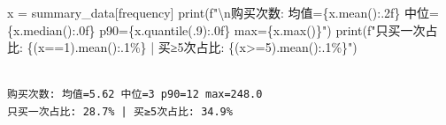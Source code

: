 \documentclass[
]{ctexart}
\newenvironment{Shaded}{\begin{snugshade}}{\end{snugshade}}
\newcommand{\BuiltInTok}[1]{\textcolor[rgb]{0.00,0.23,0.31}{#1}}
\newcommand{\CharTok}[1]{\textcolor[rgb]{0.13,0.47,0.30}{#1}}
\newcommand{\DecValTok}[1]{\textcolor[rgb]{0.68,0.00,0.00}{#1}}
\newcommand{\FloatTok}[1]{\textcolor[rgb]{0.68,0.00,0.00}{#1}}
\newcommand{\NormalTok}[1]{\textcolor[rgb]{0.00,0.23,0.31}{#1}}
\newcommand{\OperatorTok}[1]{\textcolor[rgb]{0.37,0.37,0.37}{#1}}
\newcommand{\SpecialCharTok}[1]{\textcolor[rgb]{0.37,0.37,0.37}{#1}}
\newcommand{\SpecialStringTok}[1]{\textcolor[rgb]{0.13,0.47,0.30}{#1}}
\newcommand{\StringTok}[1]{\textcolor[rgb]{0.13,0.47,0.30}{#1}}
\begin{document}
\begin{Shaded}
\begin{Highlighting}[]
\NormalTok{x }\OperatorTok{=}\NormalTok{ summary\_data[}\StringTok{\textquotesingle{}frequency\textquotesingle{}}\NormalTok{]}
\BuiltInTok{print}\NormalTok{(}\SpecialStringTok{f"}\CharTok{\textbackslash{}n}\SpecialStringTok{购买次数: 均值=}\SpecialCharTok{\{}\NormalTok{x}\SpecialCharTok{.}\NormalTok{mean()}\SpecialCharTok{:.2f\}}\SpecialStringTok{ 中位=}\SpecialCharTok{\{}\NormalTok{x}\SpecialCharTok{.}\NormalTok{median()}\SpecialCharTok{:.0f\}}\SpecialStringTok{ p90=}\SpecialCharTok{\{}\NormalTok{x}\SpecialCharTok{.}\NormalTok{quantile(}\FloatTok{.9}\NormalTok{)}\SpecialCharTok{:.0f\}}\SpecialStringTok{ max=}\SpecialCharTok{\{}\NormalTok{x}\SpecialCharTok{.}\BuiltInTok{max}\NormalTok{()}\SpecialCharTok{\}}\SpecialStringTok{"}\NormalTok{)}
\BuiltInTok{print}\NormalTok{(}\SpecialStringTok{f"只买一次占比: }\SpecialCharTok{\{}\NormalTok{(x}\OperatorTok{==}\DecValTok{1}\NormalTok{)}\SpecialCharTok{.}\NormalTok{mean()}\SpecialCharTok{:.1\%\}}\SpecialStringTok{ | 买≥5次占比: }\SpecialCharTok{\{}\NormalTok{(x}\OperatorTok{\textgreater{}=}\DecValTok{5}\NormalTok{)}\SpecialCharTok{.}\NormalTok{mean()}\SpecialCharTok{:.1\%\}}\SpecialStringTok{"}\NormalTok{)}
\end{Highlighting}
\end{Shaded}

\begin{verbatim}

购买次数: 均值=5.62 中位=3 p90=12 max=248.0
只买一次占比: 28.7% | 买≥5次占比: 34.9%
\end{verbatim}
\end{document}
